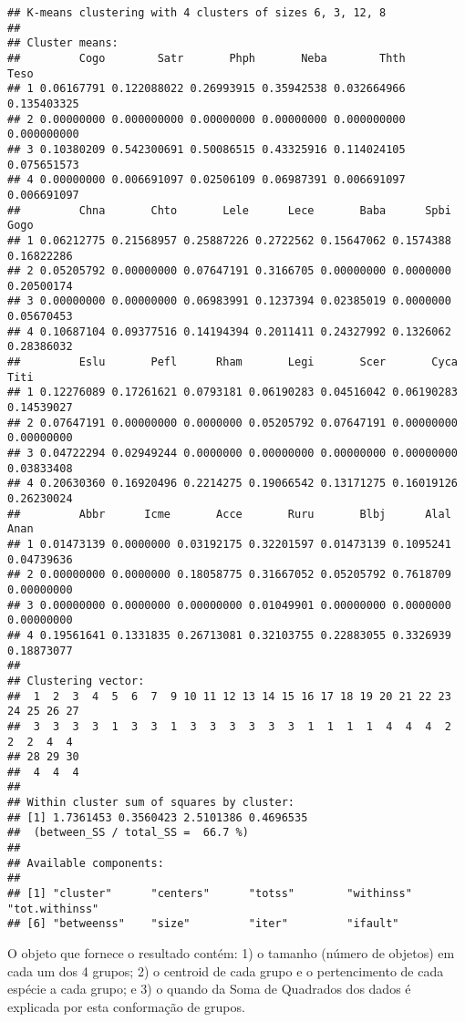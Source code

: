 \documentclass[
]{book}
\begin{document}
\begin{verbatim}
## K-means clustering with 4 clusters of sizes 6, 3, 12, 8
## 
## Cluster means:
##         Cogo        Satr       Phph       Neba        Thth        Teso
## 1 0.06167791 0.122088022 0.26993915 0.35942538 0.032664966 0.135403325
## 2 0.00000000 0.000000000 0.00000000 0.00000000 0.000000000 0.000000000
## 3 0.10380209 0.542300691 0.50086515 0.43325916 0.114024105 0.075651573
## 4 0.00000000 0.006691097 0.02506109 0.06987391 0.006691097 0.006691097
##         Chna       Chto       Lele      Lece       Baba      Spbi       Gogo
## 1 0.06212775 0.21568957 0.25887226 0.2722562 0.15647062 0.1574388 0.16822286
## 2 0.05205792 0.00000000 0.07647191 0.3166705 0.00000000 0.0000000 0.20500174
## 3 0.00000000 0.00000000 0.06983991 0.1237394 0.02385019 0.0000000 0.05670453
## 4 0.10687104 0.09377516 0.14194394 0.2011411 0.24327992 0.1326062 0.28386032
##         Eslu       Pefl      Rham       Legi       Scer       Cyca       Titi
## 1 0.12276089 0.17261621 0.0793181 0.06190283 0.04516042 0.06190283 0.14539027
## 2 0.07647191 0.00000000 0.0000000 0.05205792 0.07647191 0.00000000 0.00000000
## 3 0.04722294 0.02949244 0.0000000 0.00000000 0.00000000 0.00000000 0.03833408
## 4 0.20630360 0.16920496 0.2214275 0.19066542 0.13171275 0.16019126 0.26230024
##         Abbr      Icme       Acce       Ruru       Blbj      Alal       Anan
## 1 0.01473139 0.0000000 0.03192175 0.32201597 0.01473139 0.1095241 0.04739636
## 2 0.00000000 0.0000000 0.18058775 0.31667052 0.05205792 0.7618709 0.00000000
## 3 0.00000000 0.0000000 0.00000000 0.01049901 0.00000000 0.0000000 0.00000000
## 4 0.19561641 0.1331835 0.26713081 0.32103755 0.22883055 0.3326939 0.18873077
## 
## Clustering vector:
##  1  2  3  4  5  6  7  9 10 11 12 13 14 15 16 17 18 19 20 21 22 23 24 25 26 27 
##  3  3  3  3  1  3  3  1  3  3  3  3  3  3  1  1  1  1  4  4  4  2  2  2  4  4 
## 28 29 30 
##  4  4  4 
## 
## Within cluster sum of squares by cluster:
## [1] 1.7361453 0.3560423 2.5101386 0.4696535
##  (between_SS / total_SS =  66.7 %)
## 
## Available components:
## 
## [1] "cluster"      "centers"      "totss"        "withinss"     "tot.withinss"
## [6] "betweenss"    "size"         "iter"         "ifault"
\end{verbatim}

O objeto que fornece o resultado contém: 1) o tamanho (número de objetos) em cada um dos 4 grupos; 2) o centroid de cada grupo e o pertencimento de cada espécie a cada grupo; e 3) o quando da Soma de Quadrados dos dados é explicada por esta conformação de grupos.
\end{document}
